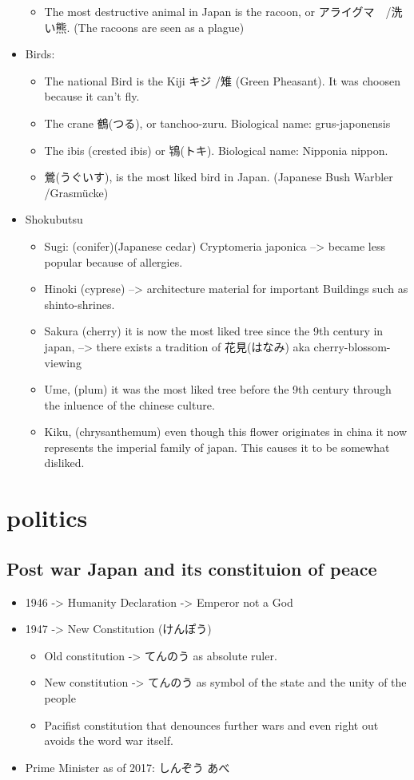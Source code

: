 \documentclass{article}
\newcommand\tabni[1][0.2cm]{\hspace*{#1}}
\begin{document}
\begin{itemize}
\begin{itemize}
\item The most destructive animal in Japan is the racoon, or アライグマ　/洗い熊. (The racoons are seen as a plague)  
\end{itemize}
\item Birds:
\begin{itemize}
\item The national Bird is the Kiji キジ /雉 (Green Pheasant). It was choosen because it can't fly.
\item The crane 鶴(つる), or tanchoo-zuru.	Biological name: grus-japonensis
\item The ibis (crested ibis) or 鴇(トキ). Biological name: Nipponia nippon.
\item 鶯(うぐいす), is the most liked bird in Japan. (Japanese Bush Warbler /Grasmücke)
\end{itemize}
\item Shokubutsu
\begin{itemize}
\item Sugi: (conifer)(Japanese cedar) Cryptomeria japonica --> became less popular because of allergies.
\item Hinoki (cyprese) --> architecture material for important Buildings such as shinto-shrines.
\item Sakura (cherry) it is now the most liked tree since the 9th century in japan, --> there exists a tradition of 花見(はなみ) aka cherry-blossom-viewing
\item Ume, (plum) it was the most liked tree before the 9th century through the inluence of the chinese culture.
\item Kiku, (chrysanthemum) even though this flower originates in china it now represents the imperial family of japan. This causes it to be somewhat disliked.
\end{itemize}
\end{itemize}
\section{ \tabni politics }
\subsection{Post war Japan and its constituion of peace}
\begin{itemize}
    \item 1946 -> Humanity Declaration -> Emperor not a God
    \item 1947 -> New Constitution (けんぽう)
    \begin{itemize}
            \item Old constitution -> てんのう as absolute ruler.
            \item New constitution -> てんのう as symbol of the state and the unity of the people
            \item Pacifist constitution that denounces further wars and even right out avoids the word war itself.
    \end{itemize}
    \item Prime Minister as of 2017: しんぞう あべ
\end{itemize}
\end{document}
